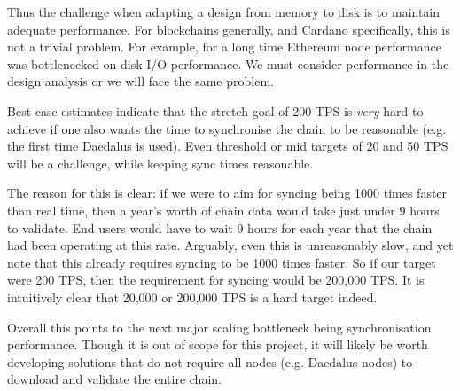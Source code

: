 \documentclass[11pt,a4paper]{article}
\begin{document}
Thus the challenge when adapting a design from memory to disk is to maintain
adequate performance. For blockchains generally, and Cardano specifically, this
is not a trivial problem. For example, for a long time Ethereum node performance
was bottlenecked on disk I/O performance. We must consider performance in the
design analysis or we will face the same problem.

Best case estimates indicate that the stretch goal of 200 TPS is \emph{very}
hard to achieve if one also wants the time to synchronise the chain to be
reasonable (e.g. the first time Daedalus is used). Even threshold or mid
targets of 20 and 50 TPS will be a challenge, while keeping sync times
reasonable.

The reason for this is clear: if we were to aim for syncing being 1000 times
faster than real time, then a year's worth of chain data would take just under
9 hours to validate. End users would have to wait 9 hours for each year that
the chain had been operating at this rate. Arguably, even this is unreasonably
slow, and yet note that this already requires syncing to be 1000 times faster.
So if our target were 200 TPS, then the requirement for syncing would be
200,000 TPS. It is intuitively clear that 20,000 or 200,000 TPS is a hard
target indeed.

Overall this points to the next major scaling bottleneck being synchronisation
performance. Though it is out of scope for this project, it will likely be
worth developing solutions that do not require all nodes (e.g. Daedalus nodes)
to download and validate the entire chain.
\end{document}
